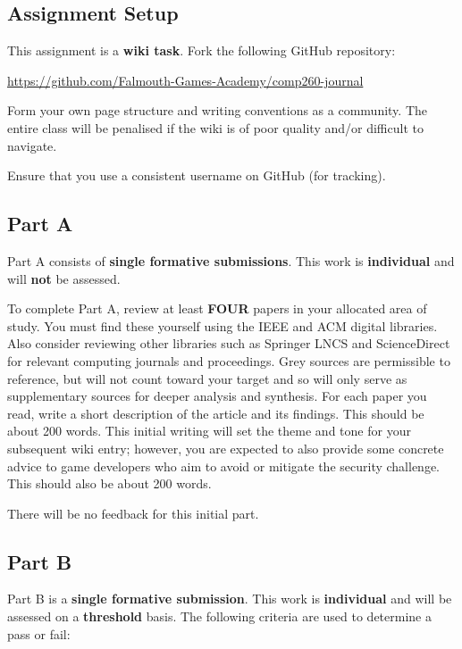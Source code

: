 \documentclass{../../fal_assignment}
\begin{document}
\subsection*{Assignment Setup}

This assignment is a \textbf{wiki task}. Fork the following GitHub repository:

\indent \url{https://github.com/Falmouth-Games-Academy/comp260-journal}

Form your own page structure and writing conventions as a community. The entire class will be penalised if the wiki is of poor quality and/or difficult to navigate. 

Ensure that you use a consistent username on GitHub (for tracking).

\subsection*{Part A}

Part A consists of \textbf{single formative submissions}. This work is \textbf{individual} and will \textbf{not} be assessed.

To complete Part A, review at least \textbf{FOUR} papers in your allocated area of study.
You must find these yourself using the IEEE and ACM digital libraries. Also consider reviewing other
libraries such as Springer LNCS and ScienceDirect for relevant computing journals and proceedings.
Grey sources are permissible to reference, but will not count toward your target and so will only serve as supplementary sources for deeper analysis and synthesis.
For each paper you read, write a short description of the article and its findings. This should be about 200 words.
This initial writing will set the theme and tone for your subsequent wiki entry;
however, you are expected to also provide some concrete advice to game developers who aim to avoid or mitigate the security challenge. This should also be about 200 words.

There will be no feedback for this initial part.

\subsection*{Part B}

Part B is a \textbf{single formative submission}. This work is \textbf{individual} and will be assessed on a \textbf{threshold} basis. The following criteria are used to determine a pass or fail:
\end{document}
